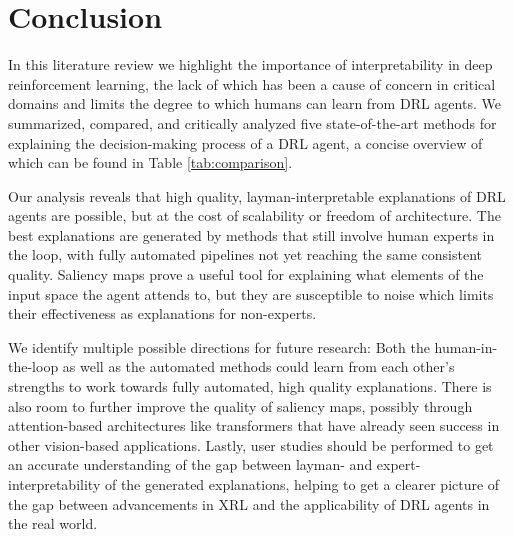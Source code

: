\documentclass[sigconf]{acmart}
\begin{document}
%
%
\section{Conclusion} \label{sec:conclusion}
In this literature review we highlight the importance of interpretability in deep reinforcement learning, the lack of which has been a cause of concern in critical domains and limits the degree to which humans can learn from DRL agents.
We summarized, compared, and critically analyzed five state-of-the-art methods for explaining the decision-making process of a DRL agent, a concise overview of which can be found in Table \ref{tab:comparison}.

Our analysis reveals that high quality, layman-interpretable explanations of DRL agents are possible, but at the cost of scalability or freedom of architecture.
The best explanations are generated by methods that still involve human experts in the loop, with fully automated pipelines not yet reaching the same consistent quality.
Saliency maps prove a useful tool for explaining what elements of the input space the agent attends to, but they are susceptible to noise which limits their effectiveness as explanations for non-experts.

We identify multiple possible directions for future research:
Both the human-in-the-loop as well as the automated methods could learn from each other's strengths to work towards fully automated, high quality explanations.
There is also room to further improve the quality of saliency maps, possibly through attention-based architectures like transformers that have already seen success in other vision-based applications.
Lastly, user studies should be performed to get an accurate understanding of the gap between layman- and expert-interpretability of the generated explanations, helping to get a clearer picture of the gap between advancements in XRL and the applicability of DRL agents in the real world.



\end{document}
